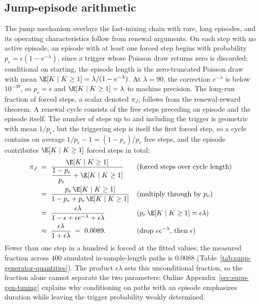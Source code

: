 \subsection{Jump-episode arithmetic}
\label{sec:supp-gen-renewal}

The jump mechanism overlays the fast-mixing chain with rare, long
episodes, and its operating characteristics follow from renewal
arguments. On each step with no active episode, an episode with at
least one forced step begins with probability
$p_e = \epsilon (1 - e^{-\lambda})$, since a trigger whose Poisson
draw returns zero is discarded; conditional on starting, the episode
length is the zero-truncated Poisson draw with mean
$\E[K \mid K \ge 1] = \lambda / (1 - e^{-\lambda})$. At $\lambda =
90$, the correction $e^{-\lambda}$ is below $10^{-39}$, so $p_e =
\epsilon$ and $\E[K \mid K \ge 1] = \lambda$ to machine precision.
The long-run fraction of forced steps, a scalar denoted $\pi_J$,
follows from the renewal-reward theorem. A renewal cycle consists of
the free steps preceding an episode and the episode itself. The number
of steps up to and including the trigger is geometric with mean
$1/p_e$, but the triggering step is itself the first forced step, so
a cycle contains on average $1/p_e - 1 = (1 - p_e)/p_e$ free steps,
and the episode contributes $\E[K \mid K \ge 1]$ forced steps in
total:
\begin{align}
  \pi_J
   &\;=\; \frac{\E[K \mid K \ge 1]}
     {\dfrac{1 - p_e}{p_e} + \E[K \mid K \ge 1]}
     && \text{(forced steps over cycle length)} \notag \\
   &\;=\; \frac{p_e\, \E[K \mid K \ge 1]}
     {1 - p_e + p_e\, \E[K \mid K \ge 1]}
     && \text{(multiply through by $p_e$)} \notag \\
   &\;=\; \frac{\epsilon \lambda}
     {1 - \epsilon + \epsilon e^{-\lambda} + \epsilon \lambda}
     && \text{($p_e\, \E[K \mid K \ge 1] = \epsilon \lambda$)} \notag \\
   &\;\approx\; \frac{\epsilon \lambda}{1 + \epsilon \lambda}
     \;=\; 0.0089.
     && \text{(drop $\epsilon e^{-\lambda}$, then $\epsilon$)}
  \label{eq:supp-rho}
\end{align}
Fewer than one step in a hundred is forced at the fitted values; the
measured fraction across $400$ simulated in-sample-length paths is
$0.0088$ (Table~\ref{tab:supp-generator-quantities}). The product
$\epsilon \lambda$ sets this unconditional fraction, so the fraction
alone cannot separate the two parameters; Online Appendix~\ref{sec:supp-gen-tuning} explains why conditioning
on paths with an episode emphasizes duration while leaving the
trigger probability weakly determined.

